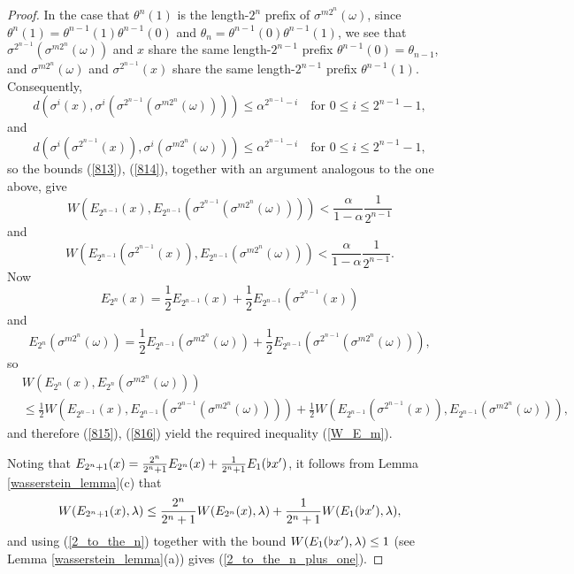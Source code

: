 \documentclass[10pt,a4paper]{amsart}
\def\b{\kern 0.02em \flat \kern 0.02em}
\begin{document}
\begin{proof}
In the case that $\theta^n(1)$
is the length-$2^n$ prefix of
$\sigma^{m2^n}(\omega)$,
since
$\theta^n(1)=\theta^{n-1}(1)\theta^{n-1}(0)$ and $\theta_n=\theta^{n-1}(0)\theta^{n-1}(1)$,
we see that $\sigma^{2^{n-1}}(\sigma^{m2^n}(\omega))$ and $x$
share the same length-$2^{n-1}$ prefix $\theta^{n-1}(0)=\theta_{n-1}$,
and
$\sigma^{m2^n}(\omega)$ and $\sigma^{2^{n-1}}(x)$
share the same length-$2^{n-1}$ prefix $\theta^{n-1}(1)$.
Consequently,
\begin{equation}\label{813}
d\left( \sigma^i(x), \sigma^i( \sigma^{2^{n-1}}(\sigma^{m2^n}(\omega)) )\right)
\le \alpha^{2^{n-1}-i} \quad\text{for }0\le i\le 2^{n-1}-1,
\end{equation}
and
\begin{equation}\label{814}
d\left( \sigma^i(\sigma^{2^{n-1}}(x)), \sigma^i(\sigma^{m2^n}(\omega) )\right)
\le \alpha^{2^{n-1}-i} \quad\text{for }0\le i\le 2^{n-1}-1,
\end{equation}
so the bounds (\ref{813}), (\ref{814}),
together with
an argument analogous to the one above, give
\begin{equation}\label{815}
W\left(E_{2^{n-1}}(x),E_{2^{n-1}}(\sigma^{2^{n-1}}(\sigma^{m2^n}(\omega)))\right) < \frac{\alpha}{1-\alpha}\frac{1}{2^{n-1}}
\end{equation}
and
\begin{equation}\label{816}
W\left(E_{2^{n-1}}(\sigma^{2^{n-1}}(x)),
E_{2^{n-1}}(\sigma^{m2^n}(\omega))\right) 
< \frac{\alpha}{1-\alpha}\frac{1}{2^{n-1}}.
\end{equation}
Now
\begin{equation*}
E_{2^n}(x)= \frac{1}{2}E_{2^{n-1}}(x) + \frac{1}{2}E_{2^{n-1}}(\sigma^{2^{n-1}}(x))
\end{equation*}
and
\begin{equation*}
E_{2^n}(\sigma^{m2^n}(\omega))
= \frac{1}{2} E_{2^{n-1}}(\sigma^{m2^n}(\omega))
+ \frac{1}{2} E_{2^{n-1}}(\sigma^{2^{n-1}}(\sigma^{m2^n}(\omega))),
\end{equation*}
so
\begin{align*}
&W \left(E_{2^n}(x),  E_{2^n}\left(\sigma^{m2^n}(\omega)\right) \right) \\
&\le
\frac{1}{2}W\left(E_{2^{n-1}}(x),E_{2^{n-1}}(\sigma^{2^{n-1}}(\sigma^{m2^n}(\omega)))\right) 
+
\frac{1}{2} W\left(E_{2^{n-1}}(\sigma^{2^{n-1}}(x)),
E_{2^{n-1}}(\sigma^{m2^n}(\omega))\right) ,
\end{align*}
and therefore (\ref{815}), (\ref{816}) yield the required inequality (\ref{W_E_m}).

Noting that $E_{2^n+1}(x)= \frac{2^n}{2^n+1} E_{2^n}(x)+\frac{1}{2^n+1} E_1(\b x')$, it follows from Lemma 
\ref{wasserstein_lemma}(c)
 that
$$
W(E_{2^{n}+1}(x),\lambda)\le  \frac{2^n}{2^n+1} W( E_{2^n}(x),\lambda) +\frac{1}{2^n+1} W(E_1(\b x'),\lambda),$$
and using (\ref{2_to_the_n}) together with the bound $ W(E_1(\b x'),\lambda)\le 1$
(see  Lemma \ref{wasserstein_lemma}(a))
 gives
(\ref{2_to_the_n_plus_one}).
\end{proof}
\end{document}
